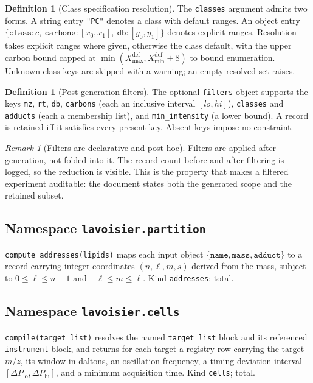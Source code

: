 \documentclass[11pt,twocolumn,a4paper]{article}
\theoremstyle{ssthm}
\theoremstyle{definition}
\newtheorem{definition}[theorem]{Definition}
\theoremstyle{remark}
\newtheorem{remark}[theorem]{Remark}
\newcommand{\shk}[1]{\texttt{#1}}
\begin{document}
\begin{definition}[Class specification resolution]
\label{def:classspec}
The \shk{classes} argument admits two forms. A string entry \shk{"PC"}
denotes a class with default ranges. An object entry
$\{\shk{class}:c,\ \shk{carbons}:[x_0,x_1],\ \shk{db}:[y_0,y_1]\}$ denotes
explicit ranges. Resolution takes explicit ranges where given, otherwise
the class default, with the upper carbon bound capped at
$\min(X_{\max}^{\mathrm{def}}, X_{\min}^{\mathrm{def}}+8)$ to bound
enumeration. Unknown class keys are skipped with a warning; an empty
resolved set raises.
\end{definition}

\begin{definition}[Post-generation filters]
\label{def:filters}
The optional \shk{filters} object supports the keys \shk{mz}, \shk{rt},
\shk{db}, \shk{carbons} (each an inclusive interval $[lo,hi]$),
\shk{classes} and \shk{adducts} (each a membership list), and
\shk{min\_intensity} (a lower bound). A record is retained iff it
satisfies every present key. Absent keys impose no constraint.
\end{definition}

\begin{remark}[Filters are declarative and post hoc]
\label{rem:filters}
Filters are applied after generation, not folded into it. The record
count before and after filtering is logged, so the reduction is visible.
This is the property that makes a filtered experiment auditable: the
document states both the generated scope and the retained subset.
\end{remark}

\subsection{Namespace \shk{lavoisier.partition}}

\shk{compute\_addresses(lipids)} maps each input object
$\{\shk{name},\shk{mass},\shk{adduct}\}$ to a record carrying integer
coordinates $(n,\ell,m,s)$ derived from the mass, subject to
$0\le\ell\le n-1$ and $-\ell\le m\le\ell$. Kind \shk{addresses}; total.

\subsection{Namespace \shk{lavoisier.cells}}

\shk{compile(target\_list)} resolves the named \shk{target\_list} block and
its referenced \shk{instrument} block, and returns for each target a
registry row carrying the target $m/z$, its window in daltons, an
oscillation frequency, a timing-deviation interval
$[\Delta P_{\mathrm{lo}},\Delta P_{\mathrm{hi}}]$, and a minimum
acquisition time. Kind \shk{cells}; total.
\end{document}
